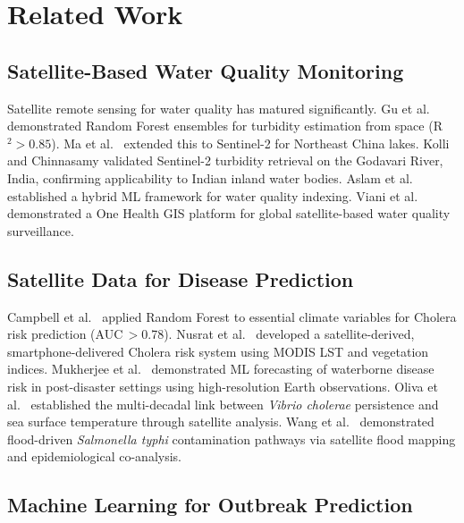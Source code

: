 \documentclass[conference]{IEEEtran}
\begin{document}
\section{Related Work}

\subsection{Satellite-Based Water Quality Monitoring}

Satellite remote sensing for water quality has matured significantly.
Gu et al.\ \cite{gu2020} demonstrated Random Forest ensembles for
turbidity estimation from space (R$^2>0.85$). Ma et al.\
\cite{ma2021} extended this to Sentinel-2 for Northeast China lakes.
Kolli and Chinnasamy \cite{kolli2024} validated Sentinel-2 turbidity
retrieval on the Godavari River, India, confirming applicability to
Indian inland water bodies. Aslam et al.\ \cite{aslam2022} established
a hybrid ML framework for water quality indexing. Viani et al.\
\cite{viani2024} demonstrated a One Health GIS platform for global
satellite-based water quality surveillance.

\subsection{Satellite Data for Disease Prediction}

Campbell et al.\ \cite{campbell2020} applied Random Forest to essential
climate variables for Cholera risk prediction (AUC\,$>$0.78). Nusrat
et al.\ \cite{nusrat2024} developed a satellite-derived, smartphone-delivered
Cholera risk system using MODIS LST and vegetation indices.
Mukherjee et al.\ \cite{mukherjee2022} demonstrated ML forecasting of
waterborne disease risk in post-disaster settings using high-resolution
Earth observations. Oliva et al.\ \cite{oliva2022} established the
multi-decadal link between \textit{Vibrio cholerae} persistence and
sea surface temperature through satellite analysis. Wang et al.\
\cite{wang2024} demonstrated flood-driven \textit{Salmonella typhi}
contamination pathways via satellite flood mapping and epidemiological
co-analysis.

\subsection{Machine Learning for Outbreak Prediction}
\end{document}
